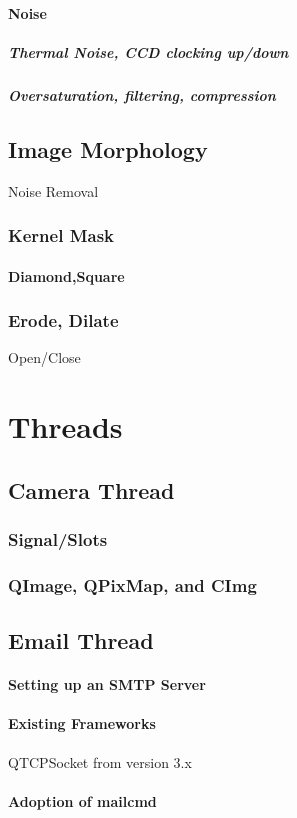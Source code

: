 \documentclass[11pt]{article} %
\begin{document}
\paragraph{Noise}
\subparagraph{Thermal Noise, CCD clocking up/down}
\subparagraph{Oversaturation, filtering, compression}
\subsection{Image Morphology}{Noise Removal}
\subsubsection{Kernel Mask}
\paragraph{Diamond,Square}
\subsubsection{Erode, Dilate}{Open/Close}
\section{Threads}
\subsection{Camera Thread}
\subsubsection{Signal/Slots}
\subsubsection{QImage, QPixMap, and CImg}
\subsection{Email Thread}
\paragraph{Setting up an SMTP Server}
\paragraph{Existing Frameworks}{QTCPSocket from version 3.x}
\paragraph{Adoption of mailcmd}
\end{document}
